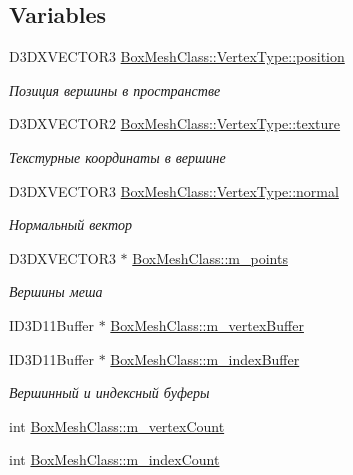 \subsection*{Variables}
\begin{DoxyCompactItemize}
\item 
D3\+D\+X\+V\+E\+C\+T\+O\+R3 \hyperlink{group___meshes_ga9114f633b9e9db265ce4a7f7eabef52f}{Box\+Mesh\+Class\+::\+Vertex\+Type\+::position}
\begin{DoxyCompactList}\small\item\em Позиция вершины в пространстве \end{DoxyCompactList}\item 
D3\+D\+X\+V\+E\+C\+T\+O\+R2 \hyperlink{group___meshes_gaf2dc401f064ea81b937be217a0effc85}{Box\+Mesh\+Class\+::\+Vertex\+Type\+::texture}
\begin{DoxyCompactList}\small\item\em Текстурные координаты в вершине \end{DoxyCompactList}\item 
D3\+D\+X\+V\+E\+C\+T\+O\+R3 \hyperlink{group___meshes_gae3644ce0f78b169c69ea857463b35c90}{Box\+Mesh\+Class\+::\+Vertex\+Type\+::normal}
\begin{DoxyCompactList}\small\item\em Нормальный вектор \end{DoxyCompactList}\item 
D3\+D\+X\+V\+E\+C\+T\+O\+R3 $\ast$ \hyperlink{group___meshes_ga04b0eafbdb4f2d3c1120b4c85c47dff7}{Box\+Mesh\+Class\+::m\+\_\+points}
\begin{DoxyCompactList}\small\item\em Вершины меша \end{DoxyCompactList}\item 
I\+D3\+D11\+Buffer $\ast$ \hyperlink{group___meshes_gad50671a0a83027a1d379e67a051236b7}{Box\+Mesh\+Class\+::m\+\_\+vertex\+Buffer}
\item 
I\+D3\+D11\+Buffer $\ast$ \hyperlink{group___meshes_ga181b814ab05f1f13665a1130ff321db5}{Box\+Mesh\+Class\+::m\+\_\+index\+Buffer}
\begin{DoxyCompactList}\small\item\em Вершинный и индексный буферы \end{DoxyCompactList}\item 
int \hyperlink{group___meshes_ga60b85c9577c5a4a1eb77f358175234d7}{Box\+Mesh\+Class\+::m\+\_\+vertex\+Count}
\item 
int \hyperlink{group___meshes_gad0398a4877027fd866fa758fb39a7f69}{Box\+Mesh\+Class\+::m\+\_\+index\+Count}

\end{DoxyCompactItemize}
